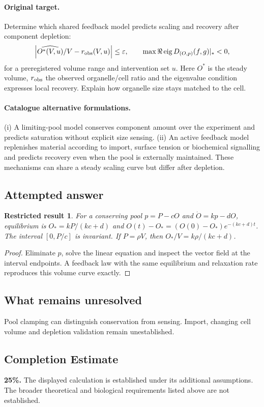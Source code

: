 \documentclass[11pt]{article}
\newtheorem{attemptresult}{Restricted result}[section]
\begin{document}
\paragraph{Original target.}
Determine which shared feedback model predicts scaling and recovery after component depletion:
\[
\left|\widehat{O^*(V,u)}/V-r_{\rm obs}(V,u)\right|\leq\varepsilon,
\qquad \max\Re\operatorname{eig}D_{(O,p)}(f,g)|_*<0,
\]
for a preregistered volume range and intervention set $u$. Here $O^*$ is the steady volume, $r_{\rm obs}$ the observed organelle/cell ratio and the eigenvalue condition expresses local recovery. Explain how organelle size stays matched to the cell.
\paragraph{Catalogue alternative formulations.}
(i) A limiting-pool model conserves component amount over the experiment and predicts saturation without explicit size sensing. (ii) An active feedback model replenishes material according to import, surface tension or biochemical signalling and predicts recovery even when the pool is externally maintained. These mechanisms can share a steady scaling curve but differ after depletion.
\subsection{Attempted answer}
\begin{attemptresult}
For a conserving pool $p=P-cO$ and $\dot O=kp-dO$, equilibrium is $O_*=kP/(kc+d)$ and $O(t)-O_*=(O(0)-O_*)e^{-(kc+d)t}$. The interval $[0,P/c]$ is invariant. If $P=\rho V$, then $O_*/V=k\rho/(kc+d)$.
\end{attemptresult}
\begin{proof}
Eliminate $p$, solve the linear equation and inspect the vector field at the interval endpoints. A feedback law with the same equilibrium and relaxation rate reproduces this volume curve exactly.
\end{proof}
\subsection{What remains unresolved}
Pool clamping can distinguish conservation from sensing. Import, changing cell volume and depletion validation remain unestablished.
\subsection{Completion Estimate}
\textbf{25\%.} The displayed calculation is established under its additional assumptions. The broader theoretical and biological requirements listed above are not established.
\end{document}
